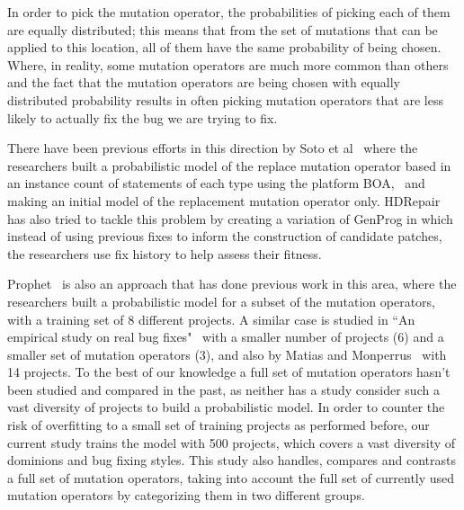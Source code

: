 \documentclass[conference]{IEEEtran}
\newcommand{\todo}[1]
  {{\scriptsize \textbf{\color{red} {#1}}}}
\begin{document}

In order to pick the mutation operator, the probabilities of picking each of
them are equally distributed; this means that from the set of mutations that can 
be applied to this location, all of them have the same probability of being 
chosen. Where, in reality, some mutation operators are much more common than 
others and the fact that the mutation operators are being chosen with equally 
distributed probability results in often 
picking mutation operators that are less likely to actually fix the bug we are 
trying to fix.

There have been previous efforts in this direction by Soto et al~\cite{Soto15} 
where the researchers built a probabilistic model of the replace mutation 
operator based in 
an instance count of statements of each type using the platform 
BOA,~\cite{dyer2013} and making an initial model of the replacement mutation 
operator only. HDRepair~\cite{xuan16} has also tried to tackle this problem by creating a variation of GenProg in which instead of using previous fixes to
inform the construction of candidate patches, the researchers use fix history
to help assess their fitness. 

Prophet~\cite{long15} is also an approach that has done previous work in this area, where the researchers built a 
probabilistic model for a subset of the mutation operators, with a training set 
of 8 different projects. A similar case is studied in ``An empirical study on real bug fixes"~\cite{zhong15} with a smaller number of projects (6) and a smaller set of 
mutation operators (3), and also by Matias and Monperrus~\cite{matias15} with 14 projects. To the best of our knowledge a full set of mutation 
operators hasn't been studied and compared in the past, as neither has a study consider such a vast diversity of projects to build a probabilistic model. In order to counter the 
risk of overfitting to a small set of training projects as performed before, our 
current study trains the model with 500 projects, which covers a vast diversity 
of dominions and bug fixing styles. This study also 
handles, compares and contrasts a full set of mutation operators, taking into
account the full set of currently used mutation operators by categorizing them 
in two different groups. 
\end{document}
